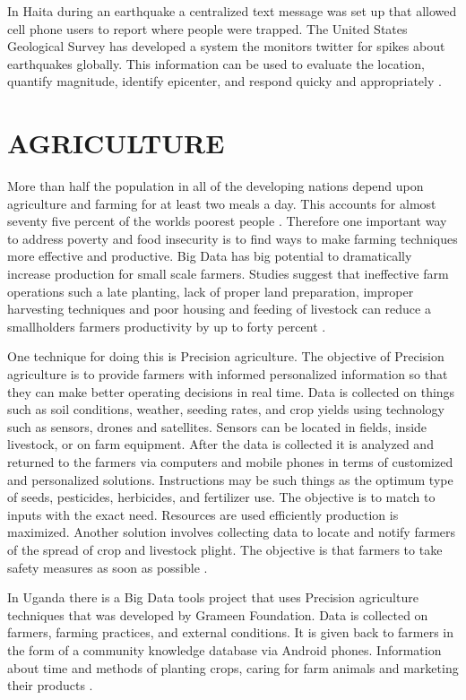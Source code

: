 \documentclass[sigconf]{acmart}
\begin{document}
In Haita during an earthquake a centralized text message was set up that allowed cell phone users to report where people were trapped. The United States Geological Survey has developed a system the monitors twitter for spikes about earthquakes globally. This information can be used to evaluate the location, quantify magnitude, identify epicenter, and respond quicky and appropriately \cite{www-google-GloPls}.

\section{AGRICULTURE}

More than half the population in all of the developing nations depend upon agriculture and farming for at least two meals a day. This accounts for almost seventy five percent of the worlds poorest people \cite{www-google-top10}. Therefore one important way to address poverty and food insecurity is to find ways to make farming techniques more effective and productive. Big Data has big potential to dramatically increase production for small scale farmers. 
Studies suggest that ineffective farm operations such a late planting, lack of proper land preparation, improper harvesting techniques and poor housing and feeding of livestock can reduce a smallholders farmers productivity by up to forty percent \cite{DevEcon}. 

One technique for doing this is Precision agriculture. The objective of Precision agriculture is to provide farmers with informed personalized information so that they can make better operating decisions in real time. Data is collected on things such as soil conditions, weather, seeding rates, and crop yields using technology such as sensors, drones and satellites. Sensors can be located in fields, inside livestock, or on farm equipment.  After the data is collected it is analyzed and returned to the farmers via computers and mobile phones in terms of customized and personalized solutions. Instructions may be such things as the optimum type of seeds, pesticides, herbicides, and fertilizer use. The objective is to match to inputs with the exact need. Resources are used efficiently production is maximized. Another solution involves collecting data to locate and notify farmers of the spread of crop and livestock plight. The objective is that farmers to take safety measures as soon as possible \cite{www-google-Hffpst}.

In Uganda there is a Big Data tools project that uses Precision agriculture techniques that was developed by Grameen Foundation. Data is collected on farmers, farming practices, and external conditions. It is given back to farmers in the form of a community knowledge database via Android phones. Information about time and methods of planting crops, caring for farm animals and marketing their products \cite{www-google-Hffpst}.
\end{document}

